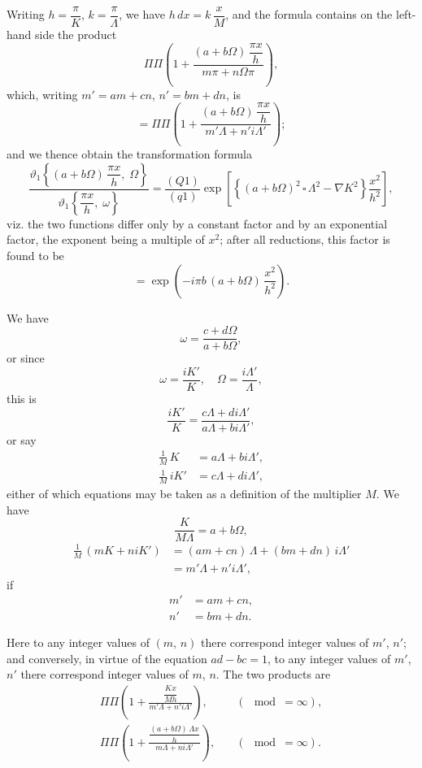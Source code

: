 \documentclass[11pt,a4paper]{article}
\theoremstyle{plain}
\theoremstyle{definition}
\theoremstyle{remark}
\begin{document}
Writing $h = \dfrac{\pi}{K}$, $k = \dfrac{\pi}{\Lambda}$, we have $h\,dx = k\,\dfrac{x}{M}$, and the formula contains on the left-hand side the product
\[
\Pi\Pi\left(1 + \frac{(a+b\Omega)\,\dfrac{\pi x}{h}}{m\pi + n\Omega\pi}\right),
\]
which, writing $m' = am + cn$, $n' = bm + dn$, is
\[
= \Pi\Pi\left(1 + \frac{(a+b\Omega)\,\dfrac{\pi x}{h}}{m'\Lambda + n'i\Lambda'}\right);
\]
and we thence obtain the transformation formula
\[
\frac{\vartheta_1\left\{(a+b\Omega)\,\dfrac{\pi x}{h},\;\Omega\right\}}{\vartheta_1\left\{\dfrac{\pi x}{h},\;\omega\right\}} = \frac{(Q1)}{(q1)} \exp\left[\left\{(a+b\Omega)^2\,\square\,\Lambda^2 - \nabla K^2\right\}\frac{x^2}{h^2}\right],
\]
viz. the two functions differ only by a constant factor and by an exponential factor, the exponent being a multiple of $x^2$; after all reductions, this factor is found to be
\[
= \exp\left(-i\pi b\,(a+b\Omega)\,\frac{x^2}{h^2}\right).
\]

We have
\[
\omega = \frac{c+d\Omega}{a+b\Omega},
\]
or since
\[
\omega = \frac{iK'}{K},\quad \Omega = \frac{i\Lambda'}{\Lambda},
\]
this is
\[
\frac{iK'}{K} = \frac{c\Lambda + di\Lambda'}{a\Lambda + bi\Lambda'},
\]
or say
\begin{align*}
\frac{1}{M}\,K &= a\Lambda + bi\Lambda',\\
\frac{1}{M}\,iK' &= c\Lambda + di\Lambda',
\end{align*}
either of which equations may be taken as a definition of the multiplier $M$. We have
\[
\frac{K}{M\Lambda} = a + b\Omega,
\]
\begin{align*}
\frac{1}{M}\,(mK + niK') &= (am+cn)\,\Lambda + (bm+dn)\,i\Lambda'\\
&= m'\Lambda + n'i\Lambda',
\end{align*}
if
\begin{align*}
m' &= am + cn,\\
n' &= bm + dn.
\end{align*}

Here to any integer values of $(m,\,n)$ there correspond integer values of $m'$, $n'$; and conversely, in virtue of the equation $ad-bc=1$, to any integer values of $m'$, $n'$ there correspond integer values of $m$, $n$. The two products are
\begin{align*}
\Pi\Pi\left(1 + \frac{\dfrac{Kx}{Mh}}{m'\Lambda + n'i\Lambda'}\right),\quad &(\mod = \infty),\\
\Pi\Pi\left(1 + \frac{\dfrac{(a+b\Omega)\,\Lambda x}{h}}{m\Lambda + ni\Lambda'}\right),\quad &(\mod = \infty).
\end{align*}
\end{document}
